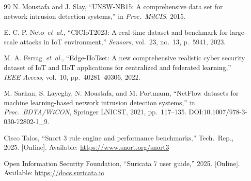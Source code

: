 \documentclass[journal,10pt,twocolumn]{IEEEtran}
\begin{document}
\begin{thebibliography}{99}
 N. Moustafa and J. Slay, ``UNSW-NB15: A comprehensive data set for network intrusion detection systems,'' in \textit{Proc.\ MilCIS}, 2015.

 E. C. P. Neto~\textit{et~al.}, ``CICIoT2023: A real-time dataset and benchmark for large-scale attacks in IoT environment,'' \textit{Sensors}, vol.~23, no.~13, p.~5941, 2023.

 M. A. Ferrag~\textit{et~al.}, ``Edge-IIoTset: A new comprehensive realistic cyber security dataset of IoT and IIoT applications for centralized and federated learning,'' \textit{IEEE Access}, vol.~10, pp.~40281--40306, 2022.

 M. Sarhan, S. Layeghy, N. Moustafa, and M. Portmann, ``NetFlow datasets for machine learning-based network intrusion detection systems,'' in \textit{Proc.\ BDTA/WiCON}, Springer LNICST, 2021, pp.~117--135. DOI:10.1007/978-3-030-72802-1\_9.

 Cisco Talos, ``Snort 3 rule engine and performance benchmarks,'' Tech.\ Rep., 2025. [Online]. Available: \url{https://www.snort.org/snort3}

 Open Information Security Foundation, ``Suricata 7 user guide,'' 2025. [Online]. Available: \url{https://docs.suricata.io}

\end{thebibliography}
\end{document}
